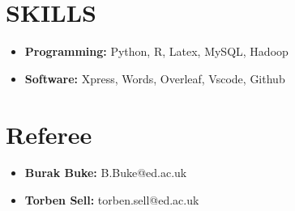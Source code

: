 \documentclass[a4paper,9pt]{extarticle}
\begin{document}
\section*{SKILLS}
\begin{itemize}
    \item \textbf{Programming:} Python, R, Latex, MySQL, Hadoop
    \item \textbf{Software:} Xpress, Words, Overleaf, Vscode, Github
\end{itemize}

\section*{Referee}
\begin{itemize}
    \item \textbf{Burak Buke:} B.Buke@ed.ac.uk
    \item \textbf{Torben Sell:} torben.sell@ed.ac.uk
\end{itemize}
\end{document}
